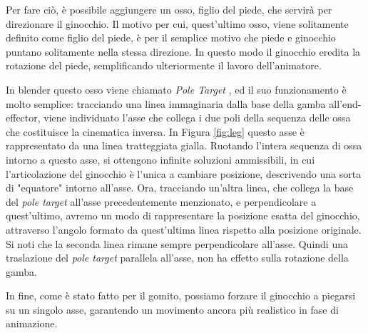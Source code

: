Per fare ciò, è possibile aggiungere un osso, figlio del piede, che servirà per direzionare il ginocchio.
Il motivo per cui, quest'ultimo osso, viene solitamente definito come figlio del piede, è per il semplice motivo che piede e ginocchio puntano solitamente nella stessa direzione.
In questo modo il ginocchio eredita la rotazione del piede, semplificando ulteriormente il lavoro dell'animatore.

In blender questo osso viene chiamato \emph{Pole Target} \cite{blendDoc}, ed il suo funzionamento è molto semplice: tracciando una linea immaginaria dalla base della gamba all'end-effector, viene individuato l'asse che collega i due poli della sequenza delle ossa che costituisce la cinematica inversa.
In Figura \ref{fig:leg} questo asse è rappresentato da una linea tratteggiata gialla.
Ruotando l'intera sequenza di ossa intorno a questo asse, si ottengono infinite soluzioni ammissibili, in cui l'articolazione del ginocchio è l'unica a cambiare posizione, descrivendo una sorta di "equatore" intorno all'asse.
Ora, tracciando un'altra linea, che collega la base del \emph{pole target} all'asse precedentemente menzionato, e perpendicolare a quest'ultimo, avremo un modo di rappresentare la posizione esatta del ginocchio, attraverso l'angolo formato da quest'ultima linea rispetto alla posizione originale.
Si noti che la seconda linea rimane sempre perpendicolare all'asse. Quindi una traslazione del \emph{pole target} parallela all'asse, non ha effetto sulla rotazione della gamba.

In fine, come è stato fatto per il gomito, possiamo forzare il ginocchio a piegarsi su un singolo asse, garantendo un movimento ancora più realistico in fase di animazione.


